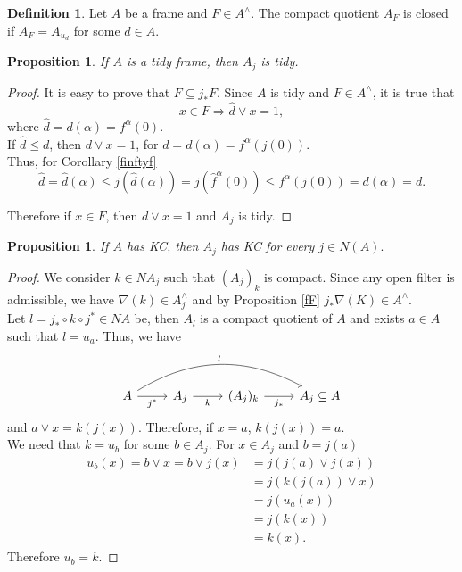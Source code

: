 \documentclass[11pt]{amsart}
\theoremstyle{plain}
\newtheorem{prop}[thm]{Proposition}
\theoremstyle{definition}
\newtheorem{dfn}[thm]{Definition}
\begin{document}
\begin{dfn}\label{ccquotien}
Let $A$ be a frame and $F\in A^\wedge$. The compact quotient $A_F$ is closed if $A_F=A_{u_d}$ for some $d\in A$.
\end{dfn}
\begin{prop}\label{tidyquout}
    If $A$ is a tidy frame, then $A_j$ is tidy.
\end{prop}

\begin{proof}
It is easy to prove that $F\subseteq j_*F$. Since $A$ is tidy and $F\in A^\wedge$, it is true that 
\[
x\in F\Rightarrow \hat{d}\vee x=1,
\]
where $\hat{d}=d(\alpha)=f^\alpha(0)$.\\
If $\hat{d}\leq d$, then $d\vee x=1$, for $d=d(\alpha)=f^\alpha(j(0))$.\\

Thus, for Corollary \ref{finftyf}
\[
\hat{d}=\hat{d}(\alpha)\leq j(\hat{d}(\alpha))=j(\hat{f}^\alpha(0))\leq f^\alpha(j(0))=d(\alpha)=d.
\]

Therefore if $x\in F$, then $d\vee x=1$ and $A_j$ is tidy.
\end{proof}

\begin{prop}\label{KCquout}
    If $A$ has KC, then $A_j$ has KC for every $j\in N(A).$
\end{prop}

\begin{proof} %
We consider $k\in NA_j$ such that $(A_j)_k$ is compact. 
Since any open filter is admissible, we have $\nabla(k)\in A_j^\wedge$ 
and by Proposition \ref{fF} $j_*\nabla(K)\in A^\wedge$.\\

Let $l=j_*\circ  k\circ j^*\in NA$ be, then $A_l$ is a compact quotient of $A$ and exists $a\in A$ such that $l=u_a$. Thus, we have 
\[
\begin{tikzcd}
	A \arrow[r, "j^*"'] \arrow[rrr, "l", bend left] & A_j \arrow[r, "k"'] & (A_j)_k \arrow[r, "j_*"'] & A_j\subseteq A
	\end{tikzcd}\]
and $a\vee x=k(j(x))$. Therefore, if $x=a$, $k(j(x))=a$.\\

We need that $k=u_b$ for some $b\in A_j$. For $x\in A_j$ and $b=j(a)$
\[
\begin{split}
u_b(x)= b\vee x= b\vee j(x)& =j(j(a)\vee j(x))\\
& =j(k(j(a))\vee x)\\
& =j(u_a(x))\\
& =j(k(x))\\	
&=k(x).
\end{split}
\]
Therefore $u_b=k$.
\end{proof}
\end{document}
